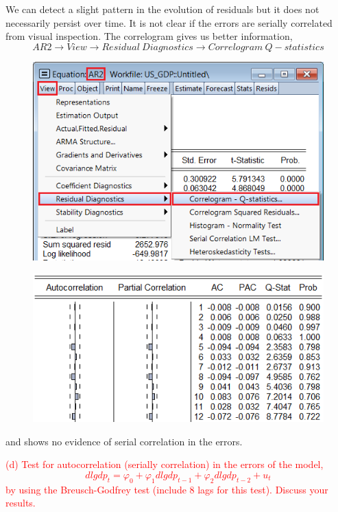 \documentclass[12pt]{report}
\begin{document}
\vspace{-\baselineskip}
\noindent We can detect a slight pattern in the evolution of residuals but it does not necessarily persist over time. It is not clear if the errors are serially correlated from visual inspection. The correlogram gives us better information, $$AR2 \to View \to Residual\ Diagnostics \to Correlogram\ Q-statistics$$
\begin{figure}[H]
	\centerline{\includegraphics{tute11_25}}
\end{figure}
\vspace{-\baselineskip}
\begin{figure}[H]
	\centerline{\includegraphics{tute11_26}}
\end{figure}
\vspace{-\baselineskip}
\noindent and shows no evidence of serial correlation in the errors.


\noindent \textcolor{red}{(d) Test for autocorrelation (serially correlation) in the errors of the model, $$dlgdp_t = \varphi_0 + \varphi_1dlgdp_{t-1} + \varphi_2dlgdp_{t-2} + u_t$$ by using the Breusch-Godfrey test (include 8 lags for this test). Discuss your results.}
\end{document}
